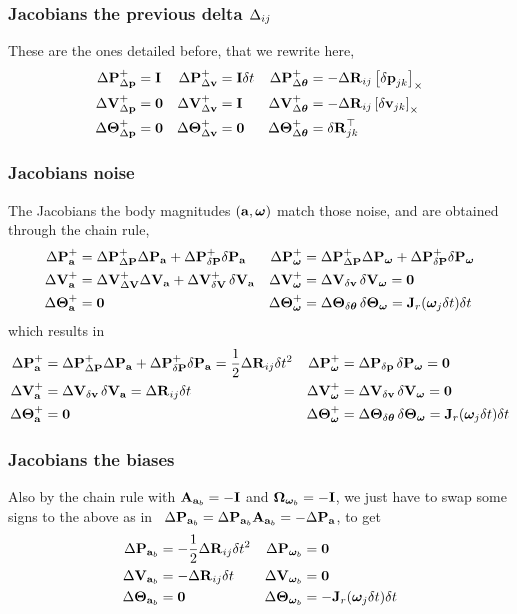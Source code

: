 \subsubsection{Jacobians \wrt the previous delta $\Delta_{ij}$}

These are the ones detailed before, that we rewrite here,
%
\begin{align*}
{\Delta{\bf P}}^+_{\Delta{\bf p}} &= {\bf I}  & {\Delta{\bf P}}^+_{\Delta{\bf v}} &= {\bf I}\delta t & {\Delta{\bf P}}^+_{\Delta{{\bm \theta}}} &= - {\Delta{\bf R}}_{ij}  \left[{\delta{\bf p}}_{jk}\right]_\times \\
{\Delta{\bf V}}^+_{\Delta{\bf p}} &= \bf0  & {\Delta{\bf V}}^+_{\Delta{\bf v}} &= {\bf I} & {\Delta{\bf V}}^+_{\Delta{{\bm \theta}}} &= - {\Delta{\bf R}}_{ij}  \left[{\delta{\bf v}}_{jk}\right]_\times  \\
{\Delta{\bm \Theta}}^+_{\Delta{\bf p}} &= \bf0  & {\Delta{\bm \Theta}}^+_{\Delta{\bf v}} &= \bf0 & {\Delta{\bm \Theta}}^+_{\Delta{{\bm \theta}}} &= {\delta{\bf R}}_{jk}^{\top} 
\end{align*}
\subsubsection{Jacobians \wrt noise}

{\color{red}
The Jacobians \wrt the body magnitudes $({\bf a},{{\bm \omega}})$ match those \wrt noise, and are obtained through the chain rule,
%
\begin{align*}
%
\DP^+_\bfa  &= \DP^+_\DP\DP_\bfa + \DP^+_\dP\dP_\bfa 
& \DP^+_\bw &= \DP^+_\DP\DP_\bw + \DP^+_\dP\dP_\bw \\
%
\DV^+_\bfa  &= \DV^+_\DV\DV_\bfa + \DV^+_\dV \, \dV_\bfa
& \DV^+_\bw &= \DV_\dv\,\dV_\bw = \bf0 \\
%
\DTH^+_\bfa  &= \bf0 
& \DTH^+_\bw &= \DTH_\dth \, \dTH_\bw = \bfJ_r(\bw_j\dt)\dt 
%
\end{align*}
%
which results in
%
\begin{align*}
%
\DP^+_\bfa  &= \DP^+_\DP\DP_\bfa + \DP^+_\dP\dP_\bfa = \frac12\DR_{ij}\dt^2 
& \DP^+_\bw &= \DP_\dpp\,\dP_\bw    = \bf0 \\
%
\DV^+_\bfa  &= \DV_\dv \, \dV_\bfa = \DR_{ij}\dt
& \DV^+_\bw &= \DV_\dv\,\dV_\bw = \bf0 \\
%
\DTH^+_\bfa  &= \bf0 
& \DTH^+_\bw &= \DTH_\dth \, \dTH_\bw = \bfJ_r(\bw_j\dt)\dt 
%
\end{align*}
%
}

\subsubsection{Jacobians \wrt the biases}

Also by the chain rule with ${\bf A}_{{\bf a}_b}=-{\bf I}$ and ${\bm \Omega}_{{{\bm \omega}}_b}=-{\bf I}$, we just have to swap some signs to the above as in \eg~${\Delta{\bf P}}_{{\bf a}_b}  = {\Delta{\bf P}}_{{\bf a}_b}{\bf A}_{{\bf a}_b} = - {\Delta{\bf P}}_{{\bf a}}$, to get
%
\begin{align*}
%
\DP_{\bfa_b}  &= - \frac12\DR_{ij}\dt^2 
& \DP_{\bw_b} &=  \bf0 \\
%
\DV_{\bfa_b}  &= - \DR_{ij}\dt
& \DV_{\bw_b} &=  \bf0 \\
%
\DTH_{\bfa_b}  &= \bf0 
& \DTH_{\bw_b} &= - \bfJ_r(\bw_j\dt)\dt 
%
\end{align*}




